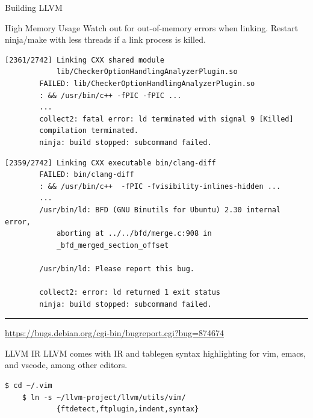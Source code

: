 \documentclass{beamer}
\begin{document}
\begin{frame}[fragile]{Building LLVM}
    \begin{alertblock}{High Memory Usage}
        Watch out for out-of-memory errors when linking. Restart ninja/make with less threads if a link process is killed.
    \end{alertblock}

    \vspace{-2ex}

    \begin{overprint}
        \begin{lstlisting}[basicstyle=\footnotesize,gobble=8]
        [2361/2742] Linking CXX shared module
            lib/CheckerOptionHandlingAnalyzerPlugin.so
        FAILED: lib/CheckerOptionHandlingAnalyzerPlugin.so
        : && /usr/bin/c++ -fPIC -fPIC ...
        ...
        collect2: fatal error: ld terminated with signal 9 [Killed]
        compilation terminated.
        ninja: build stopped: subcommand failed.
        \end{lstlisting}

        \begin{lstlisting}[basicstyle=\footnotesize,gobble=8]
        [2359/2742] Linking CXX executable bin/clang-diff
        FAILED: bin/clang-diff
        : && /usr/bin/c++  -fPIC -fvisibility-inlines-hidden ...
        ...
        /usr/bin/ld: BFD (GNU Binutils for Ubuntu) 2.30 internal error,
            aborting at ../../bfd/merge.c:908 in
            _bfd_merged_section_offset

        /usr/bin/ld: Please report this bug.

        collect2: error: ld returned 1 exit status
        ninja: build stopped: subcommand failed.
        \end{lstlisting}

        \vspace{-2ex}
        \rule{3cm}{0.5pt}

        {\footnotesize \url{https://bugs.debian.org/cgi-bin/bugreport.cgi?bug=874674}}
    \end{overprint}
\end{frame}


\begin{frame}[fragile]{LLVM IR}
    LLVM comes with IR and tablegen syntax highlighting for vim, emacs, and vscode, among other editors.

    \vspace{1cm}

    \begin{lstlisting}[basicstyle=\footnotesize,gobble=4]
    $ cd ~/.vim
    $ ln -s ~/llvm-project/llvm/utils/vim/
            {ftdetect,ftplugin,indent,syntax}
    \end{lstlisting}
\end{frame}
\end{document}
